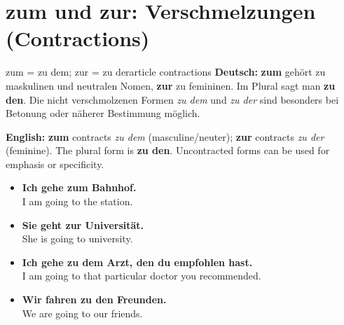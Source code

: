 \documentclass[a4paper,11pt]{article}
\newcommand{\GermanText}[1]{\textbf{Deutsch: }#1\par}
\newcommand{\EnglishText}[1]{{\small\color{SoftGray}\textbf{English: }#1\par}}
\newcommand{\ExampleItem}[2]{\item \textbf{#1}\\{\small\color{SoftGray}#2}}
\begin{document}
\section{zum und zur: Verschmelzungen (Contractions)}
\begin{grammarentry}{zum = zu dem; zur = zu der}{article contractions}
\GermanText{\textbf{zum} gehört zu maskulinen und neutralen Nomen, \textbf{zur} zu femininen. Im Plural sagt man \textbf{zu den}. Die nicht verschmolzenen Formen \emph{zu dem} und \emph{zu der} sind besonders bei Betonung oder näherer Bestimmung möglich.}
\EnglishText{\textbf{zum} contracts \emph{zu dem} (masculine/neuter); \textbf{zur} contracts \emph{zu der} (feminine). The plural form is \textbf{zu den}. Uncontracted forms can be used for emphasis or specificity.}
\end{grammarentry}
\begin{exbox}\begin{itemize}
\ExampleItem{Ich gehe zum Bahnhof.}{I am going to the station.}
\ExampleItem{Sie geht zur Universität.}{She is going to university.}
\ExampleItem{Ich gehe zu dem Arzt, den du empfohlen hast.}{I am going to that particular doctor you recommended.}
\ExampleItem{Wir fahren zu den Freunden.}{We are going to our friends.}
\end{itemize}\end{exbox}
\end{document}
